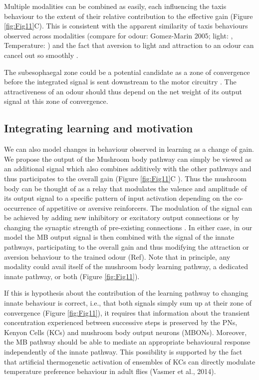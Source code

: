 \documentclass[10pt,a4paper]{article}
\begin{document}
Multiple modalities can be combined as easily, each influencing the taxis behaviour to the extent of their relative contribution to the effective gain (Figure \ref{fig:Fig11}C). This is consistent with the apparent similarity of taxis behaviours observed across modalities (compare for odour: Gomez-Marin 2005; light: \cite{kane2013sensorimotor},   Temperature: \cite{lahiri2011two}) and the fact that aversion to light and attraction to an odour can cancel out so smoothly \cite{bellmann2010optogenetically}. 

The subesophaegal zone could be a potential candidate as a zone of convergence before the integrated signal is sent downstream to the motor circuitry \cite{tastekin2015role}. The attractiveness of an odour should thus depend on the net weight of its output signal at this zone of convergence.  


\subsection{Integrating learning and motivation}
We can also model changes in behaviour observed in learning as a change of gain. We propose the output of the Mushroom body pathway \citep{gerber2004engram} can simply be viewed as an additional signal which also combines additively with the other pathways and thus participates to the overall gain (Figure \ref{fig:Fig11}C ). Thus the mushroom body can be thought of as a relay that modulates the valence and amplitude of its output signal to a specific pattern of input activation depending on the co-occurrence of appetitive or aversive reinforcers. The modulation of the signal can be achieved by adding new inhibitory or excitatory output connections or by changing the synaptic strength of pre-existing connections \citep{aso2014neuronal}. In either case, in our model the MB output signal is then combined with the signal of the innate pathways, participating to the overall gain and thus modifying the attraction or aversion behaviour to the trained odour (Ref). Note that in principle, any modality could avail itself of the mushroom body learning pathway, a dedicated innate pathway, or both (Figure \ref{fig:Fig11}). 

If this is hypothesis about the contribution of the learning pathway to changing innate behaviour is correct, i.e., that both signals simply sum up at their zone of convergence (Figure \ref{fig:Fig11}), it requires that information about the transient concentration experienced between successive steps is preserved by the PNs, Kenyon Cells (KCs) and mushroom body output neurons (MBONs). Moreover, the MB pathway should be able to mediate an appropriate behavioural response independently of the innate pathway. This possibility is supported by the fact that artificial thermogenetic activation of ensembles of KCs can directly modulate temperature preference behaviour in adult flies (Vasmer et al., 2014). 
\end{document}
